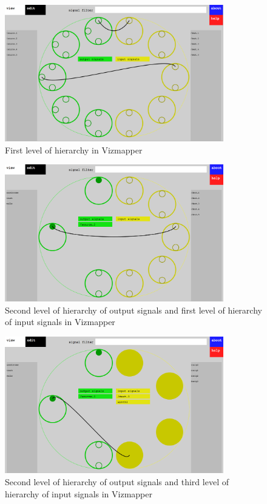 \begin{figure}[htb]
\centering
\includegraphics[width=0.85\textwidth]{root_level.png}
\caption{First level of hierarchy in Vizmapper}
\label{fig:firstLevel}
\end{figure}

\begin{figure}[htb]
\centering
\includegraphics[width=0.85\textwidth]{left_first_level.png}
\caption{Second level of hierarchy of output signals and first level of hierarchy of input signals in Vizmapper}
\label{fig:secondLevel}
\end{figure}

\begin{figure}[htb]
\centering
\includegraphics[width=0.85\textwidth]{right_second_level.png}
\caption{Second level of hierarchy of output signals and third level of hierarchy of input signals in Vizmapper}
\label{fig:thirdLevel}
\end{figure}
